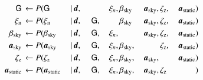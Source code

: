 \documentclass{aa}
\newcommand{\dv}[0]{\vec{d}}
\newcommand{\G}[0]{\tens{G}}
\renewcommand{\a}[0]{\vec{a}}
\begin{document}

\begin{equation}
    \label{eq:gibbschain}
\begin{aligned}
\G &\,\leftarrow P(\G&\,\mid &\,\dv,&\, &\,\phantom{\G} &\,\xi_n, &
\,\beta_{\mathrm{sky}}& \,\a_{\mathrm{sky}}, &\,\zeta_{\mathrm{z}},
&\,\a_{\mathrm{static}})\\
\xi_{\mathrm{n}} &\,\leftarrow P(\xi_{\mathrm{n}}&\,\mid &\,\dv,&\, &\,\G, &\,\phantom{\xi_n} &
\,\beta_{\mathrm{sky}}& \,\a_{\mathrm{sky}}, &\,\zeta_{\mathrm{z}},
&\,\a_{\mathrm{static}})\\
\beta_{\mathrm{sky}} &\,\leftarrow P(\beta_{\mathrm{sky}}&\,\mid &\,\dv,&\, &\,\G, &\,\xi_n, &
\,\phantom{\beta_{\mathrm{sky}}}& \,\a_{\mathrm{sky}}, &\,\zeta_{\mathrm{z}}, &\,\a_{\mathrm{static}})\\
\a_{\mathrm{sky}} &\,\leftarrow P(\a_{\mathrm{sky}}&\,\mid &\,\dv,&\, &\,\G, &\,\xi_n, &
\,\beta_{\mathrm{sky}},& \,\phantom{\a_{\mathrm{sky}},}
&\,\zeta_{\mathrm{z}}, &\,\a_{\mathrm{static}})\\
\zeta_{\mathrm{z}} &\,\leftarrow P(\zeta_{\mathrm{z}}&\,\mid &\,\dv,&\, &\,\G, &\,\xi_n, &
\,\beta_{\mathrm{sky}},& \,\a_{\mathrm{sky}},
&\,\phantom{\zeta_{\mathrm{z}},} &\,\a_{\mathrm{static}})\\
\a_{\mathrm{static}} &\,\leftarrow P(\a_{\mathrm{static}}&\,\mid &\,\dv,&\, &\,\G, &\,\xi_n, &
\,\beta_{\mathrm{sky}},& \,\a_{\mathrm{sky}}, &\,\zeta_{\mathrm{z}} &\,\phantom{\a_{\mathrm{static}}})
\end{aligned}
\end{equation}
\end{document}
